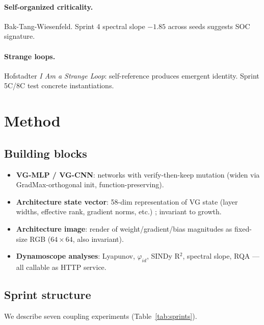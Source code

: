 \documentclass[11pt]{article}
\begin{document}
\paragraph{Self-organized criticality.} Bak-Tang-Wiesenfeld. Sprint 4 spectral slope $-1.85$ across seeds suggests SOC signature.

\paragraph{Strange loops.} Hofstadter \emph{I Am a Strange Loop}: self-reference produces emergent identity. Sprint 5C/8C test concrete instantiations.

\section{Method}

\subsection{Building blocks}
\begin{itemize}
    \item \textbf{VG-MLP / VG-CNN}: networks with verify-then-keep mutation (widen via GradMax-orthogonal init, function-preserving).
    \item \textbf{Architecture state vector}: 58-dim representation of VG state (layer widths, effective rank, gradient norms, etc.) ; invariant to growth.
    \item \textbf{Architecture image}: render of weight/gradient/bias magnitudes as fixed-size RGB ($64 \times 64$, also invariant).
    \item \textbf{Dynamoscope analyses}: Lyapunov, $\varphi_{id}$, SINDy R$^2$, spectral slope, RQA --- all callable as HTTP service.
\end{itemize}

\subsection{Sprint structure}
We describe seven coupling experiments (Table~\ref{tab:sprints}).
\end{document}
